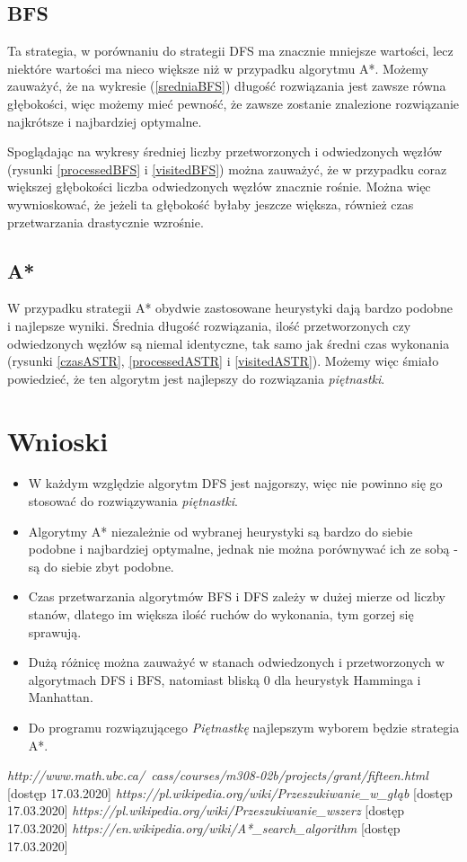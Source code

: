\documentclass{classrep}
\begin{document}
\subsection{BFS}
Ta strategia, w porównaniu do strategii DFS ma znacznie mniejsze wartości, lecz niektóre wartości ma nieco większe niż w przypadku algorytmu A*. Możemy zauważyć, że na wykresie (\ref{sredniaBFS}) długość rozwiązania jest zawsze równa głębokości, więc możemy mieć pewność, że zawsze zostanie znalezione rozwiązanie najkrótsze i najbardziej optymalne. 

Spoglądając na wykresy średniej liczby przetworzonych i odwiedzonych węzłów (rysunki \ref{processedBFS} i \ref{visitedBFS}) można zauważyć, że w przypadku coraz większej głębokości liczba odwiedzonych węzłów znacznie rośnie. Można więc wywnioskować, że jeżeli ta głębokość byłaby jeszcze większa, również czas przetwarzania drastycznie wzrośnie.
\subsection{A*}
W przypadku strategii A* obydwie zastosowane heurystyki dają bardzo podobne i najlepsze wyniki. Średnia długość rozwiązania, ilość przetworzonych czy odwiedzonych węzłów są niemal identyczne, tak samo jak średni czas wykonania (rysunki \ref{czasASTR}, \ref{processedASTR} i \ref{visitedASTR}). Możemy więc śmiało powiedzieć, że ten algorytm jest najlepszy do rozwiązania \textsl{piętnastki}.

\newpage
\section{Wnioski} %
\begin{itemize}
\item W każdym względzie algorytm DFS jest najgorszy, więc nie powinno się go stosować do rozwiązywania \textsl{piętnastki}.
\item Algorytmy A* niezależnie od wybranej heurystyki są bardzo do siebie podobne i najbardziej optymalne, jednak nie można porównywać ich ze sobą - są do siebie zbyt podobne.
\item Czas przetwarzania algorytmów BFS i DFS zależy w dużej mierze od liczby stanów, dlatego im większa ilość ruchów do wykonania, tym gorzej się sprawują. 
\item Dużą różnicę można zauważyć w stanach odwiedzonych i przetworzonych w algorytmach DFS i BFS, natomiast bliską 0 dla heurystyk Hamminga i Manhattan.
\item Do programu rozwiązującego \textsl{Piętnastkę} najlepszym wyborem będzie strategia A*.
\end{itemize}

\begin{thebibliography}{0}
  	
	 \textsl{http://www.math.ubc.ca/~cass/courses/m308-02b/projects/grant/fifteen.html} [dostęp 17.03.2020]
	 \textsl{https://pl.wikipedia.org/wiki/Przeszukiwanie\_w\_głąb} [dostęp 17.03.2020]
	 \textsl{https://pl.wikipedia.org/wiki/Przeszukiwanie\_wszerz} [dostęp 17.03.2020]
			\textsl{https://en.wikipedia.org/wiki/A*\_search\_algorithm} [dostęp 17.03.2020]
\end{thebibliography}
\end{document}
